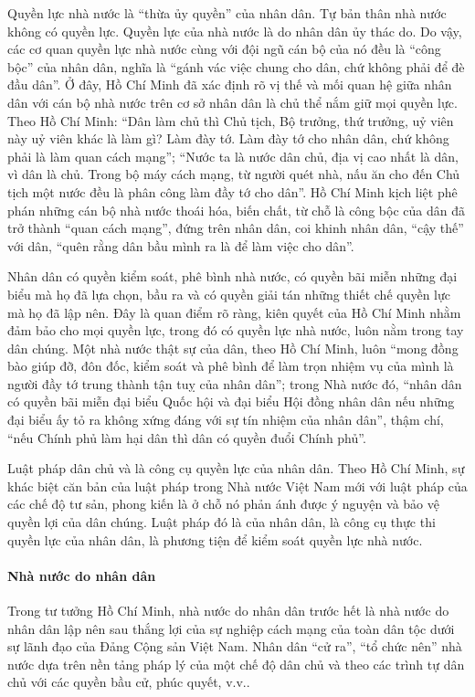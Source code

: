 Quyền lực nhà nước là “thừa ủy quyền” của nhân dân. Tự bản thân nhà nước không có quyền lực. Quyền lực của nhà nước là do nhân dân ủy thác do. Do vậy, các cơ quan quyền lực nhà nước cùng với đội ngũ cán bộ của nó đều là “công bộc” của nhân dân, nghĩa là “gánh vác việc chung cho dân, chứ không phải để đè đầu dân”. Ở đây, Hồ Chí Minh đã xác định rõ vị thế và mối quan hệ giữa nhân dân với cán bộ nhà nước trên cơ sở nhân dân là chủ thể nắm giữ mọi quyền lực. Theo Hồ Chí Minh: “Dân làm chủ thì Chủ tịch, Bộ trưởng, thứ trưởng, uỷ viên này uỷ viên khác là làm gì? Làm đày tớ. Làm đày tớ cho nhân dân, chứ không phải là làm quan cách mạng”; “Nước ta là nước dân chủ, địa vị cao nhất là dân, vì dân là chủ. Trong bộ máy cách mạng, từ người quét nhà, nấu ăn cho đến Chủ tịch một nước đều là phân công làm đầy tớ cho dân”. Hồ Chí Minh kịch liệt phê phán những cán bộ nhà nước thoái hóa, biến chất, từ chỗ là công bộc của dân đã trở thành “quan cách mạng”, đứng trên nhân dân, coi khinh nhân dân, “cậy thế” với dân, “quên rằng dân bầu mình ra là để làm việc cho dân”.

Nhân dân có quyền kiểm soát, phê bình nhà nước, có quyền bãi miễn những đại biểu mà họ đã lựa chọn, bầu ra và có quyền giải tán những thiết chế quyền lực mà họ đã lập nên. Đây là quan điểm rõ ràng, kiên quyết của Hồ Chí Minh nhằm đảm bảo cho mọi quyền lực, trong đó có quyền lực nhà nước, luôn nằm trong tay dân chúng. Một nhà nước thật sự của dân, theo Hồ Chí Minh, luôn “mong đồng bào giúp đỡ, đôn đốc, kiểm soát và phê bình để làm trọn nhiệm vụ của mình là người đầy tớ trung thành tận tuỵ của nhân dân”; trong Nhà nước đó, “nhân dân có quyền bãi miễn đại biểu Quốc hội và đại biểu Hội đồng nhân dân nếu những đại biểu ấy tỏ ra không xứng đáng với sự tín nhiệm của nhân dân”, thậm chí, “nếu Chính phủ làm hại dân thì dân có quyền đuổi Chính phủ”.

Luật pháp dân chủ và là công cụ quyền lực của nhân dân. Theo Hồ Chí Minh, sự khác biệt căn bản của luật pháp trong Nhà nước Việt Nam mới với luật pháp của các chế độ tư sản, phong kiến là ở chỗ nó phản ánh được ý nguyện và bảo vệ quyền lợi của dân chúng. Luật pháp đó là của nhân dân, là công cụ thực thi quyền lực của nhân dân, là phương tiện để kiểm soát quyền lực nhà nước.

\paragraph{Nhà nước do nhân dân}
Trong tư tưởng Hồ Chí Minh, nhà nước do nhân dân trước hết là nhà nước do nhân dân lập nên sau thắng lợi của sự nghiệp cách mạng của toàn dân tộc dưới sự lãnh đạo của Đảng Cộng sản Việt Nam. Nhân dân “cử ra”, “tổ chức nên” nhà nước dựa trên nền tảng pháp lý của một chế độ dân chủ và theo các trình tự dân chủ với các quyền bầu cử, phúc quyết, v.v..

